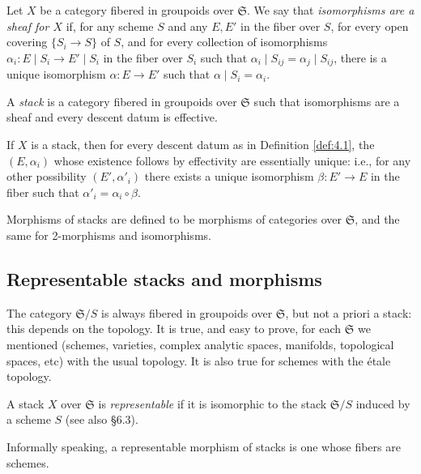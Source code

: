\documentclass[12pt]{memoir}
\begin{document}
\begin{Def}\label{def:4.2}
Let $X$ be a category fibered in groupoids over $\mathfrak{S}$. We say that \emph{isomorphisms are a sheaf for $X$} if, for any scheme $S$ and any $E, E'$ in the fiber over $S$, for every open covering $\{S_i \to S\}$ of $S$, and for every collection of isomorphisms $\alpha_i\colon E \mid S_i \to E' \mid S_i$ in the fiber over $S_i$ such that $\alpha_i \mid S_{ij} = \alpha_j \mid S_{ij}$, there is a unique isomorphism $\alpha\colon E \to E'$ such that $\alpha \mid S_i = \alpha_i$.
\end{Def}


\begin{Def}\label{def:4.3}
A \emph{stack} is a category fibered in groupoids over $\mathfrak{S}$ such that isomorphisms are a sheaf and every descent datum is effective.
\end{Def}

If $X$ is a stack, then for every descent datum as in Definition \ref{def:4.1}, the $(E, \alpha_i)$ whose existence follows by effectivity are essentially unique: i.e., for any other possibility $(E', \alpha'_i)$ there exists a unique isomorphism $\beta\colon E' \to E$ in the fiber such that $\alpha'_i = \alpha_i \circ \beta$.

Morphisms of stacks are defined to be morphisms of categories over $\mathfrak{S}$, and the same for 2-morphisms and isomorphisms.

\subsection{Representable stacks and morphisms}

The category $\mathfrak{S}/S$ is always fibered in groupoids over $\mathfrak{S}$, but not a priori a stack: this depends on the topology. It is true, and easy to prove, for each $\mathfrak{S}$ we mentioned (schemes, varieties, complex analytic spaces, manifolds, topological spaces, etc) with the usual topology. It is also true for schemes with the \'etale topology.

\begin{Def}\label{def:4.4}
A stack $X$ over $\mathfrak{S}$ is \emph{representable} if it is isomorphic to the stack $\mathfrak{S}/S$ induced by a scheme $S$ (see also \S 6.3).
\end{Def}

Informally speaking, a representable morphism of stacks is one whose fibers are schemes.
\end{document}
